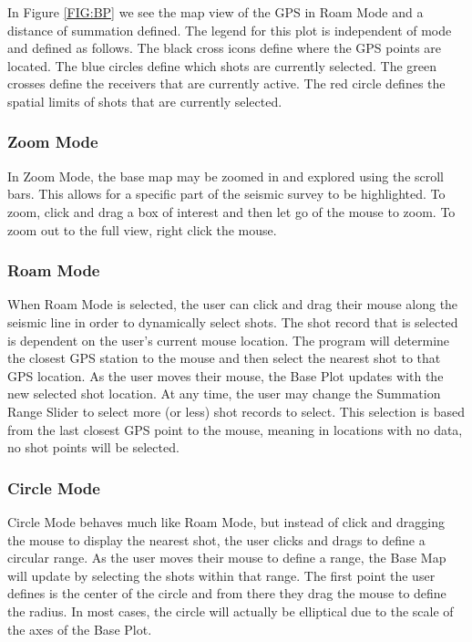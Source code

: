 \documentclass[12pt]{article}
\begin{document}
In Figure \ref{FIG:BP} we see the map view of the GPS in Roam Mode and a distance of summation defined. The legend for this plot is independent of mode and defined as follows. The black cross icons define where the GPS points are located. The blue circles define which shots are currently selected. The green crosses define the receivers that are currently active. The red circle defines the spatial limits of shots that are currently selected.

\subsubsection{Zoom Mode}

In Zoom Mode, the base map may be zoomed in and explored using the scroll bars. This allows for a specific part of the seismic survey to be highlighted. To zoom, click and drag a box of interest and then let go of the mouse to zoom. To zoom out to the full view, right click the mouse. 

\subsubsection{Roam Mode}

When Roam Mode is selected, the user can click and drag their mouse along the seismic line in order to dynamically select shots. The shot record that is selected is dependent on the user's current mouse location. The program will determine the closest GPS station to the mouse and then select the nearest shot to that GPS location. As the user moves their mouse, the Base Plot updates with the new selected shot location. At any time, the user may change the Summation Range Slider to select more (or less) shot records to select. This selection is based from the last closest GPS point to the mouse, meaning in locations with no data, no shot points will be selected.

\subsubsection{Circle Mode}

Circle Mode behaves much like Roam Mode, but instead of click and dragging the mouse to display the nearest shot, the user clicks and drags to define a circular range. As the user moves their mouse to define a range, the Base Map will update by selecting the shots within that range. The first point the user defines is the center of the circle and from there they drag the mouse to define the radius. In most cases, the circle will actually be elliptical due to the scale of the axes of the Base Plot.
\end{document}
